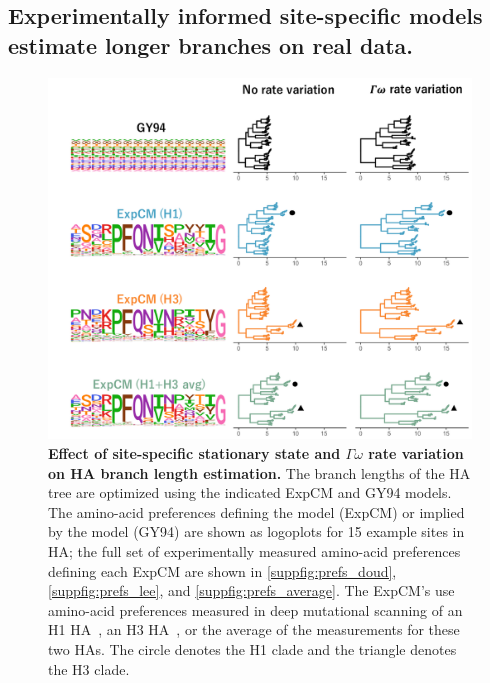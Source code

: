 \documentclass[11pt]{article}
\begin{document}
\subsection*{Experimentally informed site-specific models estimate longer branches on real data.}

\begin{figure}
\centerline{\includegraphics[width=\textwidth]{figures/empirical_trees.pdf}}
\caption{\label{fig:empirical_trees}
\textbf{Effect of site-specific stationary state and $\Gamma\omega$ rate variation on HA branch length estimation.} 
The branch lengths of the HA tree are optimized using the indicated ExpCM and GY94 models. 
The amino-acid preferences defining the model (ExpCM) or implied by the model (GY94) are shown as logoplots for 15 example sites in HA; the full set of experimentally measured amino-acid preferences defining each ExpCM are shown in \ref{suppfig:prefs_doud}, \ref{suppfig:prefs_lee}, and \ref{suppfig:prefs_average}. 
The ExpCM's use amino-acid preferences measured in deep mutational scanning of an H1 HA~\citep{doud2016accurate}, an H3 HA~\citep{lee2018deep}, or the average of the measurements for these two HAs.
The circle denotes the H1 clade and the triangle denotes the H3 clade. 
}
\end{figure}
\end{document}
